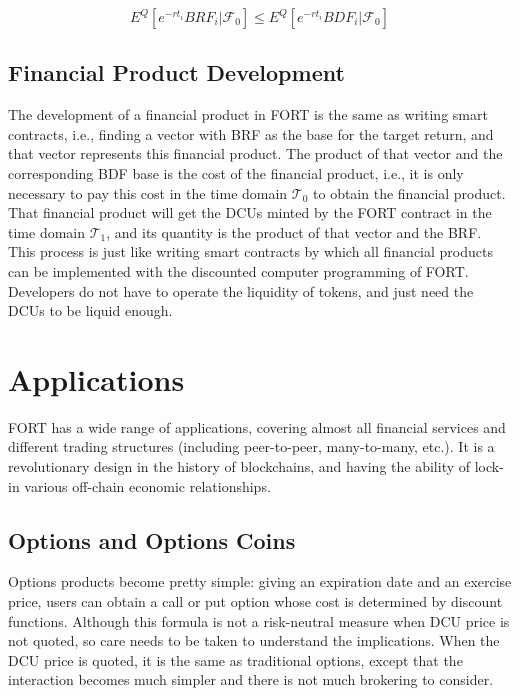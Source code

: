 \documentclass[letterpaper,12pt]{article}
\begin{document}
\begin{equation}
E^Q\left[e^{-rt_{i}}BRF_{i}|\mathcal{F}_0\right] \leq E^Q\left[e^{-rt_{i}}BDF_{i}|\mathcal{F}_0\right] 
\end{equation}

\subsection{Financial Product Development}

The development of a financial product in FORT is the same as writing smart contracts, i.e., finding a vector with BRF as the base for the target return, and that vector represents this financial product. 
The product of that vector and the corresponding BDF base is the cost of the financial product, i.e., it is only necessary to pay this cost in the time domain $\mathcal{T}_0$ to obtain the financial product. 
That financial product will get the DCUs minted by the FORT contract in the time domain $\mathcal{T}_1$, and its quantity is the product of that vector and the BRF.
This process is just like writing smart contracts by which all financial products can be implemented with the discounted computer programming of FORT. 
Developers do not have to operate the liquidity of tokens, and just need the DCUs to be liquid enough.

\section{Applications}

FORT has a wide range of applications, covering almost all financial services and different trading structures (including peer-to-peer, many-to-many, etc.). 
It is a revolutionary design in the history of blockchains, and having the ability of lock-in various off-chain economic relationships.

\subsection{Options and Options Coins}

Options products become pretty simple: giving an expiration date and an exercise price, users can obtain a call or put option whose cost is determined by discount functions. 
Although this formula is not a risk-neutral measure when DCU price is not quoted, so care needs to be taken to understand the implications. 
When the DCU price is quoted, it is the same as traditional options, except that the interaction becomes much simpler and there is not much brokering to consider.
\end{document}
